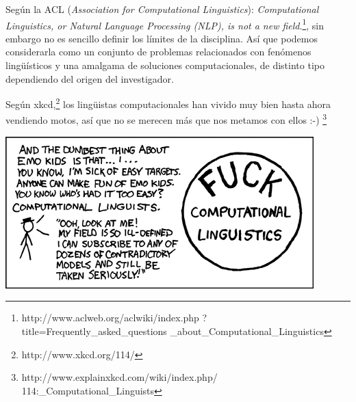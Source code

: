 \documentclass[]{tufte-handout}
\begin{document}
Según la ACL (\emph{Association for Computational Linguistics}):
\emph{Computational Linguistics, or Natural Language Processing (NLP),
is not a new field}.\footnote{http://www.aclweb.org/aclwiki/index.php
?title=Frequently\_asked\_questions
\_about\_Computational\_Linguistics}, sin embargo no es sencillo definir
los límites de la disciplina. Así que podemos considerarla como un
conjunto de problemas relacionados con fenómenos lingüísticos y una
amalgama de soluciones computacionales, de distinto tipo dependiendo del
origen del investigador.

Según xkcd,\footnote{http://www.xkcd.org/114/} los lingüistas
computacionales han vivido muy bien hasta ahora vendiendo motos, así que
no se merecen más que nos metamos con ellos :-)
\footnote{http://www.explainxkcd.com/wiki/index.php/
114:\_Computational\_Linguists}

\includegraphics{img/xkcd_cl.png}
\end{document}

